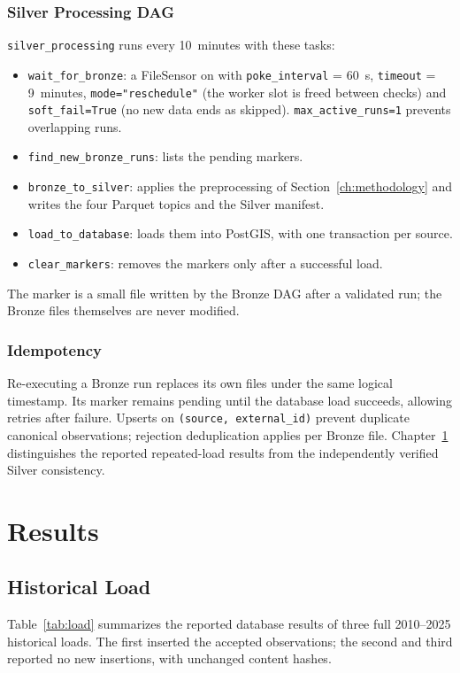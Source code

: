 \documentclass[a4paper,11pt,oneside]{book}
\begin{document}
\subsection{Silver Processing DAG}
\texttt{silver\_processing} runs every 10~minutes with these tasks:
\begin{itemize}[nosep]
  \item \texttt{wait\_for\_bronze}: a FileSensor on  with \texttt{poke\_interval} = 60~s, \texttt{timeout} = 9~minutes, \texttt{mode="reschedule"} (the worker slot is freed between checks) and \texttt{soft\_fail=True} (no new data ends as skipped). \texttt{max\_active\_runs=1} prevents overlapping runs.
  \item \texttt{find\_new\_bronze\_runs}: lists the pending markers.
  \item \texttt{bronze\_to\_silver}: applies the preprocessing of Section~\ref{ch:methodology} and writes the four Parquet topics and the Silver manifest.
  \item \texttt{load\_to\_database}: loads them into PostGIS, with one transaction per source.
  \item \texttt{clear\_markers}: removes the markers only after a successful load.
\end{itemize}
The marker is a small file written by the Bronze DAG after a validated run; the Bronze files themselves are never modified.
\subsection{Idempotency}
Re-executing a Bronze run replaces its own files under the same logical timestamp. Its marker remains pending until the database load succeeds, allowing retries after failure. Upserts on \texttt{(source, external\_id)} prevent duplicate canonical observations; rejection deduplication applies per Bronze file. Chapter~\ref{ch:results} distinguishes the reported repeated-load results from the independently verified Silver consistency.

\chapter{Results}
\label{ch:results}

\section{Historical Load}
Table~\ref{tab:load} summarizes the reported database results of three full 2010--2025 historical loads. The first inserted the accepted observations; the second and third reported no new insertions, with unchanged content hashes.
\end{document}
